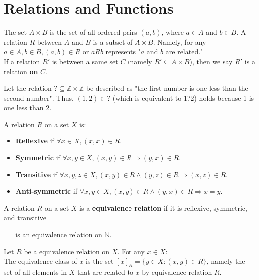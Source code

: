 \documentclass[main.tex]{subfiles}
\begin{document}
\section{Relations and Functions}

\begin{definition}
    The set $A \times B$ is the set of all ordered pairs $(a, b)$, where $a \in A$ and $b \in B$. A relation $R$ between $A$ and $B$ is a subset of $A \times B$. Namely, for any $a \in A, b \in B, (a, b) \in R$ or $aRb$ represents "$a$ and $b$ are related." \\
    If a relation $R'$ is between a same set $C$ (namely $R' \subseteq A \times B$), then we say $R'$ is a relation \textbf{on} $C$.
\end{definition}

\begin{example}
    Let the relation $? \subseteq \mathbb{Z} \times \mathbb{Z}$ be described as "the first number is one less than the second number". Thus, $(1, 2) \in ?$ (which is equivalent to $1?2$) holds because 1 is one less than 2.
\end{example}

\begin{definition}
    A relation $R$ on a set $X$ is:
    \begin{itemize}
        \item \textbf{Reflexive} if $\forall x \in X, (x, x) \in R$.
        \item \textbf{Symmetric} if $\forall x, y \in X, (x, y) \in R \Longrightarrow (y, x) \in R$.
        \item \textbf{Transitive} if $\forall x, y, z \in X, (x, y) \in R \wedge (y, z) \in R \Longrightarrow (x, z) \in R$.
        \item \textbf{Anti-symmetric} if $\forall x, y \in X, (x, y) \in R \wedge (y, x) \in R \Longrightarrow x = y$.
    \end{itemize}
\end{definition}

\begin{definition}
    A relation $R$ on a set $X$ is a \textbf{equivalence relation} if it is reflexive, symmetric, and transitive
\end{definition}

\begin{example}
    $=$ is an equivalence relation on $\mathbb{N}$.
\end{example}

\begin{definition}
    Let $R$ be a equivalence relation on $X$. For any $x \in X$:\\
    The equivalence class of $x$ is the set $[x]_{R}= \{y \in X : (x, y) \in R\}$, namely the set of all elements in $X$ that are related to $x$ by equivalence relation $R$.
\end{definition}
\end{document}
